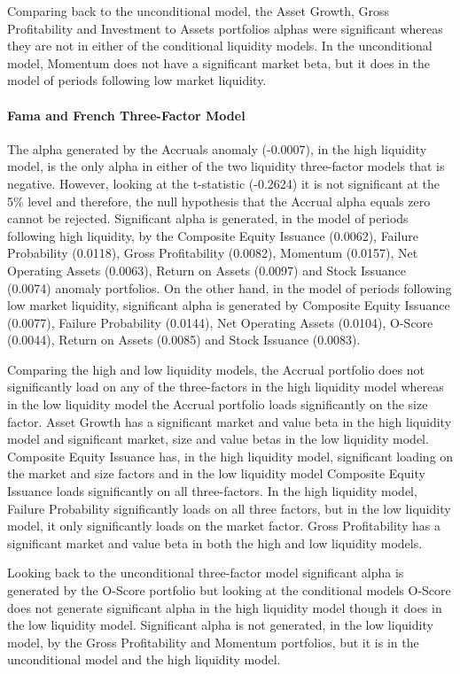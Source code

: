 \documentclass[12pt, a4paper, oneside]{article}
\begin{document}
Comparing back to the unconditional model, the Asset Growth, Gross Profitability and Investment to Assets portfolios alphas were significant whereas they are not in either of the conditional liquidity models. In the unconditional model, Momentum does not have a significant market beta, but it does in the model of periods following low market liquidity. 

\paragraph{Fama and French Three-Factor Model}
The alpha generated by the Accruals anomaly (-0.0007), in the high liquidity model, is the only alpha in either of the two liquidity three-factor models that is negative. However, looking at the t-statistic (-0.2624) it is not significant at the 5\% level and therefore, the null hypothesis that the Accrual alpha equals zero cannot be rejected. Significant alpha is generated, in the model of periods following high liquidity, by the Composite Equity Issuance (0.0062), Failure Probability (0.0118), Gross Profitability (0.0082), Momentum (0.0157), Net Operating Assets (0.0063), Return on Assets (0.0097) and Stock Issuance (0.0074) anomaly portfolios. On the other hand, in the model of periods following low market liquidity, significant alpha is generated by Composite Equity Issuance (0.0077), Failure Probability (0.0144), Net Operating Assets (0.0104), O-Score (0.0044), Return on Assets (0.0085) and Stock Issuance (0.0083). 

Comparing the high and low liquidity models, the Accrual portfolio does not significantly load on any of the three-factors in the high liquidity model whereas in the low liquidity model the Accrual portfolio loads significantly on the size factor. Asset Growth has a significant market and value beta in the high liquidity model and significant market, size and value betas in the low liquidity model. Composite Equity Issuance has, in the high liquidity model, significant loading on the market and size factors and in the low liquidity model Composite Equity Issuance loads significantly on all three-factors. In the high liquidity model, Failure Probability significantly loads on all three factors, but in the low liquidity model, it only significantly loads on the market factor. Gross Profitability has a significant market and value beta in both the high and low liquidity models. 

Looking back to the unconditional three-factor model significant alpha is generated by the O-Score portfolio but looking at the conditional models O-Score does not generate significant alpha in the high liquidity model though it does in the low liquidity model. Significant alpha is not generated, in the low liquidity model, by the Gross Profitability and Momentum portfolios, but it is in the unconditional model and the high liquidity model.
\end{document}
